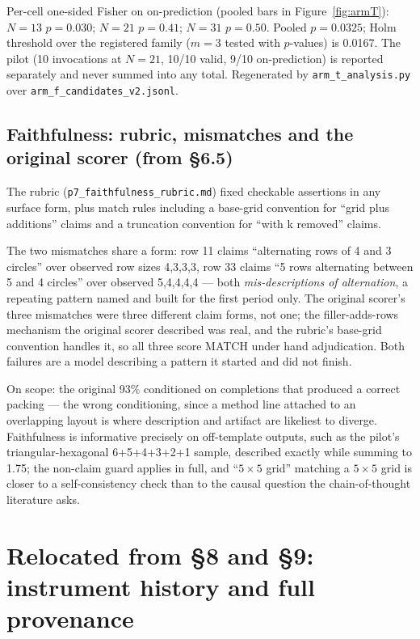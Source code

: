 Per-cell one-sided Fisher on on-prediction (pooled bars in Figure~\ref{fig:armT}): $N = 13$
$p = 0.030$; $N = 21$ $p = 0.41$; $N = 31$ $p = 0.50$. Pooled $p = 0.0325$; Holm threshold over the
registered family ($m = 3$ tested with $p$-values) is 0.0167. The pilot (10 invocations at
$N = 21$, 10/10 valid, 9/10 on-prediction) is reported separately and never summed into any total.
Regenerated by \texttt{arm\_t\_analysis.py} over \texttt{arm\_f\_candidates\_v2.jsonl}.

\subsection{Faithfulness: rubric, mismatches and the original scorer (from \S6.5)}

The rubric (\texttt{p7\_faithfulness\_rubric.md}) fixed checkable assertions in any surface form,
plus match rules including a base-grid convention for ``grid plus additions'' claims and a
truncation convention for ``with k removed'' claims.

The two mismatches share a form: row 11 claims ``alternating rows of 4 and 3 circles'' over
observed row sizes 4,3,3,3, row 33 claims ``5 rows alternating between 5 and 4 circles'' over
observed 5,4,4,4,4 --- both \emph{mis-descriptions of alternation}, a repeating pattern named and
built for the first period only. The original scorer's three mismatches were three different claim
forms, not one; the filler-adds-rows mechanism the original scorer described was real, and the
rubric's base-grid convention handles it, so all three score MATCH under hand adjudication. Both
failures are a model describing a pattern it started and did not finish.

On scope: the original 93\% conditioned on completions that produced a correct packing --- the
wrong conditioning, since a method line attached to an overlapping layout is where description and
artifact are likeliest to diverge. Faithfulness is informative precisely on off-template outputs,
such as the pilot's triangular-hexagonal 6+5+4+3+2+1 sample, described exactly while summing to
1.75; the non-claim guard applies in full, and ``$5 \times 5$ grid'' matching a $5 \times 5$ grid is
closer to a self-consistency check than to the causal question the chain-of-thought literature
asks.

\section{Relocated from \S8 and \S9: instrument history and full provenance}

